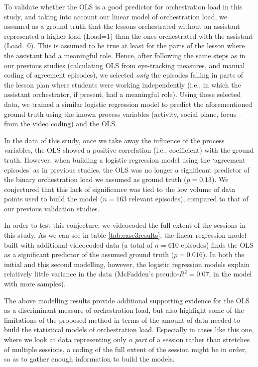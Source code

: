 \documentclass[10pt,journal,compsoc]{IEEEtran}
\begin{document}
To validate whether the OLS is a good predictor for orchestration load in this study, and taking into account our linear model of orchestration load, we assumed as a ground truth that the lessons orchestrated without an assistant represented a higher load (Load=1) than the ones orchestrated with the assistant (Load=0). This is assumed to be true at least for the parts of the lesson where the assistant had a meaningful role. Hence, after following the same steps as in our previous studies (calculating OLS from eye-tracking measures, and manual coding of agreement episodes), we selected \textit{only} the episodes falling in parts of the lesson plan where students were working independently (i.e., in which the assistant orchestrator, if present, had a meaningful role). Using these selected data, we trained a similar logistic regression model to predict the aforementioned ground truth using the known process variables (activity, social plane, focus -- from the video coding) and the OLS.

In the data of this study, once we take away the influence of the process variables, the OLS showed a positive correlation (i.e., coefficient) with the ground truth. However, when building a logistic regression model using the `agreement episodes' as in previous studies, the OLS was no longer a significant predictor of the binary orchestration load we assumed as ground truth ($p=0.13$). We conjectured that this lack of significance was tied to the low volume of data points used to build the model ($n=163$ relevant episodes), compared to that of our previous validation studies.

In order to test this conjecture, we videocoded the full extent of the sessions in this study. As we can see in table \ref{tab:case3results}, the linear regression model built with additional videocoded data (a total of $n=610$ episodes) finds the OLS as a significant predictor of the assumed ground truth ($p=0.016$). In both the initial and this second modelling, however, the logistic regression models explain relatively little variance in the data (McFadden's pseudo-$R^2=0.07$, in the model with more samples). 

The above modelling results provide additional supporting evidence for the OLS as a discriminant measure of orchestration load, but also highlight some of the limitations of the proposed method in terms of the amount of data needed to build the statistical models of orchestration load. Especially in cases like this one, where we look at data representing only \textit{a part} of a session rather than stretches of multiple sessions, a coding of the full extent of the session might be in order, so as to gather enough information to build the models.
\end{document}
